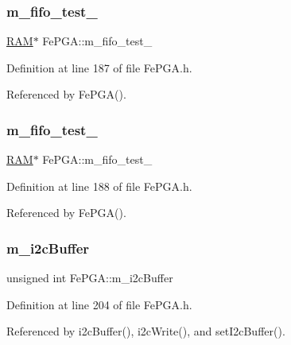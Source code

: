 \subsubsection{\texorpdfstring{m\+\_\+fifo\+\_\+test\+\_}{m\_fifo\_test\_1}}
{\footnotesize\ttfamily \hyperlink{classRAM}{R\+AM}$\ast$ Fe\+P\+G\+A\+::m\+\_\+fifo\+\_\+test\+\_\hspace{0.3cm}{\ttfamily [private]}}



Definition at line 187 of file Fe\+P\+G\+A.\+h.



Referenced by Fe\+P\+G\+A().

\mbox{\label{classFePGA_ad42013742385c695067b466c933665c9}} 
\subsubsection{\texorpdfstring{m\+\_\+fifo\+\_\+test\+\_}{m\_fifo\_test\_2}}
{\footnotesize\ttfamily \hyperlink{classRAM}{R\+AM}$\ast$ Fe\+P\+G\+A\+::m\+\_\+fifo\+\_\+test\+\_\hspace{0.3cm}{\ttfamily [private]}}



Definition at line 188 of file Fe\+P\+G\+A.\+h.



Referenced by Fe\+P\+G\+A().

\mbox{\label{classFePGA_a173664ffd6a73f454ae31f51e689dd16}} 
\subsubsection{\texorpdfstring{m\+\_\+i2c\+Buffer}{m\_i2cBuffer}}
{\footnotesize\ttfamily unsigned int Fe\+P\+G\+A\+::m\+\_\+i2c\+Buffer\hspace{0.3cm}{\ttfamily [private]}}



Definition at line 204 of file Fe\+P\+G\+A.\+h.



Referenced by i2c\+Buffer(), i2c\+Write(), and set\+I2c\+Buffer().

